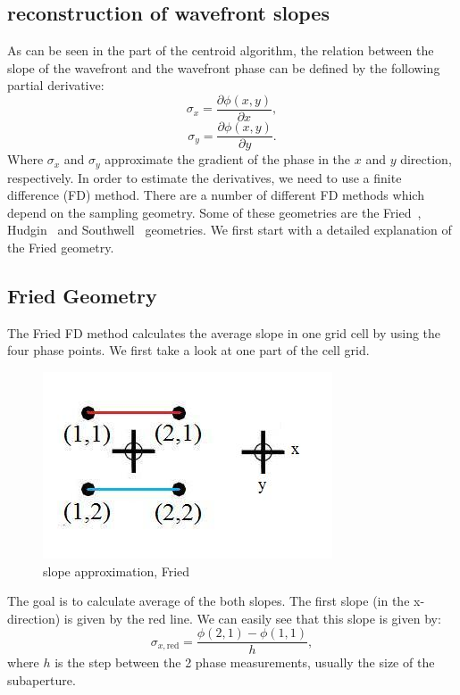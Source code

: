 \documentclass{article}
\begin{document}
\subsection{reconstruction of wavefront slopes}
As can be seen in the part of the centroid algorithm, the relation between the slope of the wavefront and the wavefront phase can be defined by the following partial derivative:
$$ \sigma_x = \frac{\partial\phi(x,y)}{\partial x},$$ 
$$ \sigma_y = \frac{\partial\phi(x,y)}{\partial y}.$$ 
Where $\sigma_x$ and $\sigma_y$ approximate the gradient of the phase in the $x$ and $y$ direction, respectively.
In order to estimate the derivatives, we need to use a finite difference (FD) method. There are a number of different FD methods which depend on the sampling geometry. Some of these geometries are the Fried~\cite{fried1977least}, Hudgin~\cite{hudgin1977wave} and Southwell~\cite{southwell1980wave} geometries. We first start with a detailed explanation of the Fried geometry.

\subsection{Fried Geometry}
The Fried FD method calculates the average slope in one grid cell by using the four phase points. We first take a look at one part of the cell grid.
\begin{figure}[h!]
  \centering
  \includegraphics[scale=0.6]{figures/fried}
  \caption{slope approximation, Fried}
\end{figure}
\newpage
\noindent The goal is to calculate average of the both slopes. The first slope (in the x-direction) is given by the red line. We can easily see that this slope is given by:
$$ \sigma_{x,\text{red}} = \frac{\phi(2,1) - \phi(1,1)}{h}, $$
where $h$ is the step between the 2 phase measurements, usually the size of the subaperture.
\end{document}

